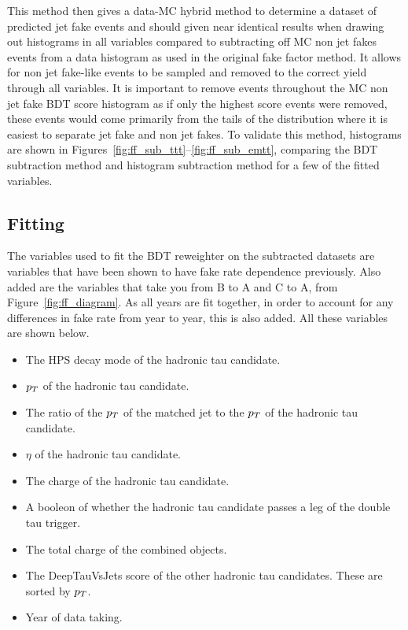 This method then gives a data-MC hybrid method to determine a dataset of predicted jet fake events and should given near identical results when drawing out histograms in all variables compared to subtracting off MC non jet fakes events from a data histogram as used in the original fake factor method.
It allows for non jet fake-like events to be sampled and removed to the correct yield through all variables.
It is important to remove events throughout the MC non jet fake BDT score histogram as if only the highest score events were removed, these events would come primarily from the tails of the distribution where it is easiest to separate jet fake and non jet fakes.
To validate this method, histograms are shown in Figures~\ref{fig:ff_sub_ttt}--\ref{fig:ff_sub_emtt}, comparing the BDT subtraction method and histogram subtraction method for a few of the fitted variables.

\subsection{Fitting}

The variables used to fit the BDT reweighter on the subtracted datasets are variables that have been shown to have fake rate dependence previously. Also added are the variables that take you from B to A and C to A, from Figure~\ref{fig:ff_diagram}. As all years are fit together, in order to account for any differences in fake rate from year to year, this is also added. All these variables are shown below.

\begin{itemize}
\item The HPS decay mode of the hadronic tau candidate.
\item $p_{T}$ of the hadronic tau candidate.
\item The ratio of the $p_{T}$  of the matched jet to the $p_{T}$ of the hadronic tau candidate.
\item $\eta$ of the hadronic tau candidate.
\item The charge of the hadronic tau candidate.
\item A booleon of whether the hadronic tau candidate passes a leg of the double tau trigger.
\item The total charge of the combined objects.
\item The DeepTauVsJets score of the other hadronic tau candidates. These are sorted by $p_{T}$.
\item Year of data taking.
\end{itemize}


